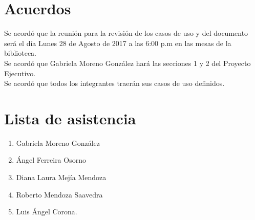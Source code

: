 \documentclass[12pt]{article}
\begin{document}
\section{Acuerdos}
	Se acordó que la reunión para la revisión de los casos de uso y del documento será el día Lunes 28 de Agosto de 2017 a las 6:00 p.m en las mesas de la biblioteca. \\
	
	Se acordó que Gabriela Moreno González hará las secciones 1 y 2 del Proyecto Ejecutivo. \\
	
	Se acordó que todos los integrantes traerán sus casos de uso definidos. \\
\section{Lista de asistencia}
\begin{enumerate}
 	 \item  Gabriela Moreno González
	 \item  Ángel Ferreira Osorno
	 \item  Diana Laura Mejía Mendoza
	 \item  Roberto Mendoza Saavedra
	 \item Luis Ángel Corona.
\end{enumerate}
\end{document}
